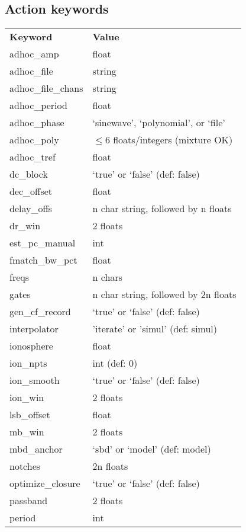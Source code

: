 \subsection{Action keywords}
\begin{tabular}{ll}
    \textbf{Keyword} & \textbf{Value} \\
   adhoc\_amp        & float \\
   adhoc\_file       & string \\
   adhoc\_file\_chans & string \\
   adhoc\_period     & float \\
   adhoc\_phase      & `sinewave', `polynomial', or `file' \\
   adhoc\_poly       & $\leq 6$ floats/integers (mixture OK) \\
   adhoc\_tref       & float \\
   dc\_block         & `true' or `false' (def: false) \\
   dec\_offset       & float \\
   delay\_offs       & n char string, followed by n floats \\
   dr\_win           & 2 floats \\
   est\_pc\_manual   & int \\
   fmatch\_bw\_pct   &  float \\
   freqs            & n chars \\
   gates            & n char string, followed by 2n floats \\
   gen\_cf\_record  & `true' or `false' (def: false) \\
   interpolator     & 'iterate' or 'simul' (def: simul) \\
   ionosphere       & float \\
   ion\_npts        &  int (def: 0)\\
   ion\_smooth      & `true' or `false' (def: false) \\
   ion\_win         &  2 floats \\
   lsb\_offset      &  float \\
   mb\_win          &  2 floats \\
   mbd\_anchor      &  `sbd' or `model' (def: model) \\
   notches          & 2n floats \\
   optimize\_closure & `true' or `false' (def: false) \\
   passband         & 2 floats \\
   period           & int \\

\end{tabular}
